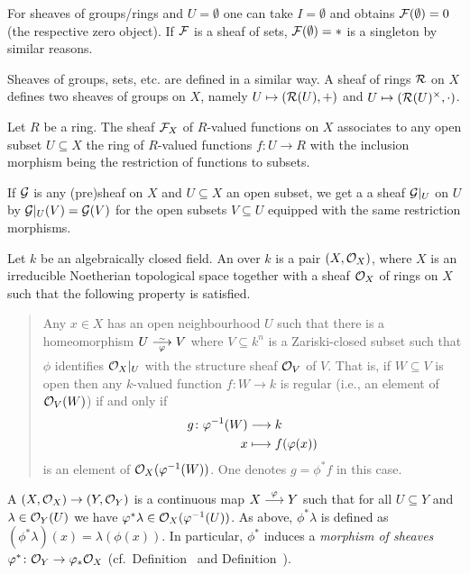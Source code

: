 \documentclass[a4paper,parskip=half,numbers=enddot, DIV=12]{scrreprt}
\begin{document}
\begin{rem}
    For sheaves of groups/rings and $U=\emptyset$ one can take $I=\emptyset$ and obtains $\mathcal{F}(\emptyset) = 0$ (the respective zero object). If $\mathcal{F}$ is a sheaf of sets, $\mathcal{F}(\emptyset)=*$ is a singleton by similar reasons.
\end{rem}
\begin{rem}
    Sheaves of groups, sets, etc. are defined in a similar way. A sheaf of rings $\mathcal{R}$ on $X$ defines two sheaves of groups on $X$, namely $U\mapsto (\mathcal{R}(U), +)$ and $U\mapsto (\mathcal{R}(U)^\times, \cdot)$.
\end{rem}
\begin{example}
	    Let $R$ be a ring. The sheaf $\mathcal{F}_X$ of $R$-valued functions on $X$ associates to any open subset $U\subseteq X$ the ring of $R$-valued functions $f\colon U \to R$ with the inclusion morphism being the restriction of functions to subsets.
\end{example}
\begin{rem*}
	  If $\mathcal{G}$ is any (pre)sheaf on $X$ and $U\subseteq X$ an open subset, we get a a sheaf $\mathcal{G}|_U$ on $U$ by $\mathcal{G}|_U(V) = \mathcal{G}(V)$ for the open subsets $V\subseteq U$ equipped with the same restriction morphisms.
\end{rem*}
\begin{defi} 
	    Let $k$ be an algebraically closed field. An  over $k$ is a pair $(X,\mathcal{O}_X)$, where $X$ is an irreducible Noetherian topological space together with a sheaf $\mathcal{O}_X$ of rings on $X$ such that the following property is satisfied.
	    \begin{quote}
	        Any $x\in X$ has an open neighbourhood $U$ such that there is a homeomorphism $U\isomorphism[\phi] V$ where $V\subseteq k^n$ is a Zariski-closed subset such that $\phi$ identifies $\mathcal{O}_X|_U$ with the structure sheaf $\mathcal{O}_V$ of $V$. That is, if $W \subseteq V$ is open then any $k$-valued function $f\colon W\to k$ is regular (i.e., an element of $\mathcal{O}_V(W)$) if and only if 
	        \begin{align*}
	            g\colon \varphi^{-1}(W) &\longrightarrow k\\
	            x&\longmapsto f(\varphi(x))
	        \end{align*}
	        is an element of $\mathcal{O}_X(\varphi^{-1}(W))$. One denotes $g=\phi^*f$ in this case.
	    \end{quote}
	    A  $(X,\mathcal{O}_X) \to (Y,\mathcal{O}_Y)$ is a continuous map $X\morphism[\phi] Y$ such that for all $U\subseteq Y$ and $\lambda \in \mathcal{O}_Y(U)$ we have $\varphi^\ast \lambda \in \mathcal{O}_X(\varphi^{-1}(U))$. As above, $\phi^\ast\lambda$ is defined as $(\phi^\ast\lambda)(x) = \lambda(\phi(x))$. In particular, $\phi^*$ induces a \emph{morphism of sheaves} $\varphi^*\colon \mathcal{O}_Y\to\varphi_*\mathcal{O}_X$ (cf.\ Definition~ and Definition~).
	\end{defi}
\end{document}
